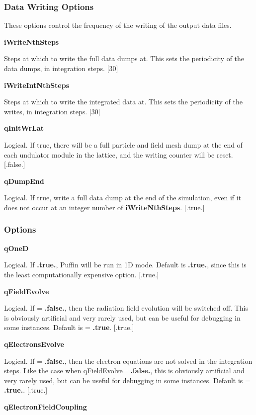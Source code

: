 \documentclass[12pt]{article}%
\begin{document}
\subsubsection{Data Writing Options}

These options control the frequency of the writing of the output data files.

{\bf iWriteNthSteps}

Steps at which to write the full data dumps at. This sets the periodicity of the data dumps, in integration steps. [$30$]

{\bf iWriteIntNthSteps}

Steps at which to write the integrated data at. This sets the periodicity of the writes, in integration steps. [$30$]

{\bf qInitWrLat}

Logical. If true, there will be a full particle and field mesh dump at the end of each undulator module in the lattice, and the writing counter will be reset. [.false.]

{\bf qDumpEnd}

Logical. If true, write a full data dump at the end of the simulation, even if it does not occur at an integer number of {\bf iWriteNthSteps}. [.true.]




\subsubsection{Options}

{\bf qOneD}

Logical. If  {\bf .true.}, Puffin will be run in 1D mode. Default is  {\bf .true.}, since this is the least computationally expensive option. [.true.]

{\bf qFieldEvolve}

Logical. If = {\bf .false.}, then the radiation field evolution will be switched off. This is obviously artificial and very rarely used, but can be useful for debugging in some instances. Default is = {\bf .true}. [.true.]

{\bf qElectronsEvolve}

Logical. If = {\bf .false.}, then the electron equations are not solved in the integration steps. Like the case when qFieldEvolve= {\bf .false.},  this is obviously artificial and very rarely used, but can be useful for debugging in some instances. Default is = {\bf .true.}. [.true.]

{\bf qElectronFieldCoupling}
\end{document}
